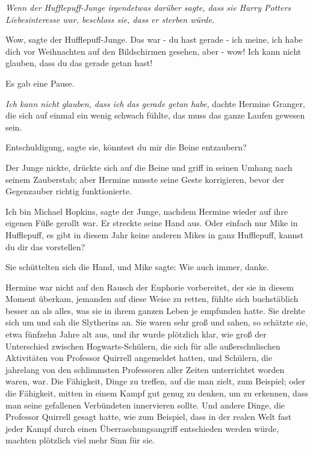 \emph{Wenn der Hufflepuff-Junge irgendetwas darüber sagte, dass sie Harry
Potters Liebesinteresse war, beschloss sie, dass er sterben würde.}

\glqq{}Wow\grqq{}, sagte der Hufflepuff-Junge. \glqq{}Das war - du hast gerade -
ich meine, ich habe dich vor Weihnachten auf den Bildschirmen gesehen, aber -
wow! Ich kann nicht glauben, dass du das gerade getan hast!\grqq{}

Es gab eine Pause.

\emph{Ich kann nicht glauben, dass ich das gerade getan habe,} dachte Hermine
Granger, die sich auf einmal ein wenig schwach fühlte, das muss das ganze Laufen
gewesen sein.

\glqq{}Entschuldigung\grqq{}, sagte sie, \glqq{}könntest du mir die Beine
entzaubern?\grqq{}

Der Junge nickte, drückte sich auf die Beine und griff in seinen Umhang nach
seinem Zauberstab; aber Hermine musste seine Geste korrigieren, bevor der
Gegenzauber richtig funktionierte.

\glqq{}Ich bin Michael Hopkins\grqq{}, sagte der Junge, nachdem Hermine wieder
auf ihre eigenen Füße gerollt war. Er streckte seine Hand aus. \glqq{}Oder
einfach nur Mike in Hufflepuff, es gibt in diesem Jahr keine anderen Mikes in
ganz Hufflepuff, kannst du dir das vorstellen?\grqq{}

Sie schüttelten sich die Hand, und Mike sagte: \glqq{}Wie auch immer,
danke.\grqq{}

Hermine war nicht auf den Rausch der Euphorie vorbereitet, der sie in diesem
Moment überkam, jemanden auf diese Weise zu retten, fühlte sich buchstäblich
besser an als alles, was sie in ihrem ganzen Leben je empfunden hatte. Sie
drehte sich um und sah die Slytherins an. Sie waren sehr groß und sahen, so
schätzte sie, etwa fünfzehn Jahre alt aus, und ihr wurde plötzlich klar, wie
groß der Unterschied zwischen Hogwarts-Schülern, die sich für alle
außerschulischen Aktivitäten von Professor Quirrell angemeldet hatten, und
Schülern, die jahrelang von den schlimmsten Professoren aller Zeiten
unterrichtet worden waren, war. Die Fähigkeit, Dinge zu treffen, auf die man
zielt, zum Beispiel; oder die Fähigkeit, mitten in einem Kampf gut genug zu
denken, um zu erkennen, dass man seine gefallenen Verbündeten innervieren
sollte. Und andere Dinge, die Professor Quirrell gesagt hatte, wie zum Beispiel,
dass in der realen Welt fast jeder Kampf durch einen Überraschungsangriff
entschieden werden würde, machten plötzlich viel mehr Sinn für sie.

